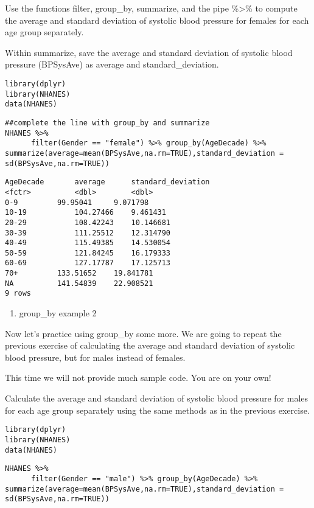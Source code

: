 \documentclass[]{article}
\providecommand{\tightlist}{%
  \setlength{\itemsep}{0pt}\setlength{\parskip}{0pt}}
\begin{document}
Use the functions filter, group\_by, summarize, and the pipe
\%\textgreater{}\% to compute the average and standard deviation of
systolic blood pressure for females for each age group separately.

Within summarize, save the average and standard deviation of systolic
blood pressure (BPSysAve) as average and standard\_deviation.

\begin{verbatim}
library(dplyr)
library(NHANES)
data(NHANES)
\end{verbatim}

\begin{verbatim}
##complete the line with group_by and summarize
NHANES %>%
      filter(Gender == "female") %>% group_by(AgeDecade) %>% summarize(average=mean(BPSysAve,na.rm=TRUE),standard_deviation = sd(BPSysAve,na.rm=TRUE))
\end{verbatim}

\begin{verbatim}
AgeDecade       average      standard_deviation
<fctr>          <dbl>        <dbl>
0-9         99.95041     9.071798
10-19           104.27466    9.461431
20-29           108.42243    10.146681
30-39           111.25512    12.314790
40-49           115.49385    14.530054
50-59           121.84245    16.179333
60-69           127.17787    17.125713
70+         133.51652    19.841781
NA          141.54839    22.908521
9 rows
\end{verbatim}

\begin{enumerate}
\def\labelenumi{\arabic{enumi}.}
\setcounter{enumi}{5}
\tightlist
\item
  group\_by example 2
\end{enumerate}

Now let's practice using group\_by some more. We are going to repeat the
previous exercise of calculating the average and standard deviation of
systolic blood pressure, but for males instead of females.

This time we will not provide much sample code. You are on your own!

Calculate the average and standard deviation of systolic blood pressure
for males for each age group separately using the same methods as in the
previous exercise.

\begin{verbatim}
library(dplyr)
library(NHANES)
data(NHANES)
\end{verbatim}

\begin{verbatim}
NHANES %>%
      filter(Gender == "male") %>% group_by(AgeDecade) %>% summarize(average=mean(BPSysAve,na.rm=TRUE),standard_deviation = sd(BPSysAve,na.rm=TRUE))
\end{verbatim}
\end{document}
